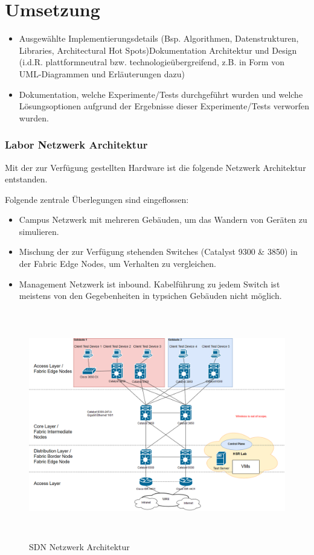 \section{Umsetzung}

\begin{itemize}
	\item Ausgewählte Implementierungsdetails (Bsp. Algorithmen, Datenstrukturen, Libraries, Architectural Hot Spots)Dokumentation Architektur und Design (i.d.R. plattformneutral bzw. technologieübergreifend, z.B. in Form von UML-Diagrammen und Erläuterungen dazu)
	\item Dokumentation, welche Experimente/Tests durchgeführt wurden und welche Lösungsoptionen aufgrund der Ergebnisse dieser Experimente/Tests verworfen wurden.
\end{itemize}

\subsubsection{Labor Netzwerk Architektur}
Mit der zur Verfügung gestellten Hardware ist die folgende Netzwerk Architektur entstanden.

Folgende zentrale Überlegungen sind eingeflossen:

\begin{itemize}
	\item Campus Netzwerk mit mehreren Gebäuden, um das Wandern von Geräten zu simulieren.
	\item Mischung der zur Verfügung stehenden Switches (Catalyst 9300 \& 3850) in der Fabric Edge Nodes, um Verhalten zu vergleichen.
	\item Management Netzwerk ist inbound. Kabelführung zu jedem Switch ist meistens von den Gegebenheiten in typsichen Gebäuden nicht möglich.
\end{itemize}


\begin{figure}[H]
	\centering
	\includegraphics[height=10cm]{img/LabNetworkArchitecture.png}
	\caption{SDN Netzwerk Architektur}
	\label{fig:LabNetworkArchitecture}
\end{figure}

